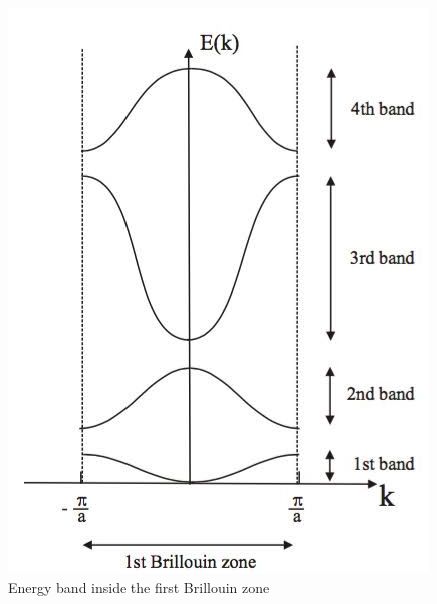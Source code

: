 \begin{figure}
	\centering
	\includegraphics[scale=0.45]{./bands_in_first_brillouin_zone.jpg}
	\caption{Energy band inside the first Brillouin zone}
	\label{fig:firstbrillouinzone}
\end{figure}

